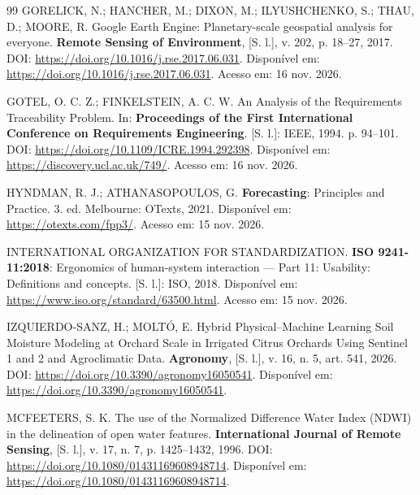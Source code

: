 \begin{thebibliography}{99}
\MakeUppercase{Gorelick}, N.; \MakeUppercase{Hancher}, M.; \MakeUppercase{Dixon}, M.; \MakeUppercase{Ilyushchenko}, S.; \MakeUppercase{Thau}, D.; \MakeUppercase{Moore}, R.
{Google Earth Engine}: Planetary-scale geospatial analysis for everyone.
\textbf{Remote Sensing of Environment}, [S. l.],
v. 202,
p. 18--27,
2017.
DOI: \url{https://doi.org/10.1016/j.rse.2017.06.031}.
Disponível em: \url{https://doi.org/10.1016/j.rse.2017.06.031}.
Acesso em: 16 nov. 2026.

\MakeUppercase{Gotel}, O. C. Z.; \MakeUppercase{Finkelstein}, A. C. W.
An Analysis of the Requirements Traceability Problem.
In:
\textbf{Proceedings of the First International Conference on Requirements Engineering}.
[S. l.]: IEEE, 1994.
p. 94--101.
DOI: \url{https://doi.org/10.1109/ICRE.1994.292398}.
Disponível em: \url{https://discovery.ucl.ac.uk/749/}.
Acesso em: 16 nov. 2026.

\MakeUppercase{Hyndman}, R. J.; \MakeUppercase{Athanasopoulos}, G.
\textbf{Forecasting}: Principles and Practice.
3. ed.
Melbourne: OTexts, 2021.
Disponível em: \url{https://otexts.com/fpp3/}.
Acesso em: 15 nov. 2026.

\MakeUppercase{{International Organization for Standardization}}.
\textbf{{ISO 9241-11:2018}}: Ergonomics of human-system interaction --- Part 11: Usability: Definitions and concepts.
[S. l.]: ISO, 2018.
Disponível em: \url{https://www.iso.org/standard/63500.html}.
Acesso em: 15 nov. 2026.

\MakeUppercase{Izquierdo-Sanz}, H.; \MakeUppercase{Moltó}, E.
Hybrid Physical--Machine Learning Soil Moisture Modeling at Orchard Scale in Irrigated Citrus Orchards Using Sentinel 1 and 2 and Agroclimatic Data.
\textbf{Agronomy}, [S. l.],
v. 16,
n. 5,
art. 541,
2026.
DOI: \url{https://doi.org/10.3390/agronomy16050541}.
Disponível em: \url{https://doi.org/10.3390/agronomy16050541}.

\MakeUppercase{McFeeters}, S. K.
The use of the Normalized Difference Water Index ({NDWI}) in the delineation of open water features.
\textbf{International Journal of Remote Sensing}, [S. l.],
v. 17,
n. 7,
p. 1425--1432,
1996.
DOI: \url{https://doi.org/10.1080/01431169608948714}.
Disponível em: \url{https://doi.org/10.1080/01431169608948714}.


\end{thebibliography}

